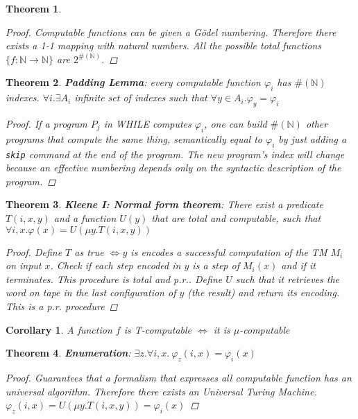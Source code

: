 \documentclass[10pt,landscape]{article}
\newcommand{\N}{\mathbb{N}}
\renewcommand{\iff}{\Leftrightarrow}
\theoremstyle{plain}%
\newtheorem*{thm}{Theorem}
\newtheorem*{cor}{Corollary}
\theoremstyle{definition}
\theoremstyle{remark}
\begin{document}
\begin{multicols}{4}
\begin{thm}
    \begin{proof}
        Computable functions can be given a Gödel numbering. Therefore there exists a 1-1 mapping with
        natural numbers. All the possible total functions $\{f: \N \to \N \}$ are $2^{\#(\N)}$.
    \end{proof}
\end{thm}


\begin{thm}
    \textbf{Padding Lemma}: every computable function $\varphi_i$ has $\#(\N)$ indexes.
    $\forall i . \exists A_i $ infinite set of indexes such that $\forall y \in A_i. \varphi_y = \varphi_i$

    \begin{proof}
        If a program $P_j$ in WHILE computes $\varphi_i$, one can build 
        $\#(\N)$ other programs that compute the same thing, semantically equal to
        $\varphi_i$ by just adding a \texttt{skip} command at the end of the program.
        The new program's index will change because an effective numbering depends only 
        on the syntactic description of the program.  
    \end{proof}
\end{thm}

\columnbreak

\begin{thm}
    \textbf{Kleene I: Normal form theorem}: There exist a predicate $T(i,x,y)$
    and a function $U(y)$ that are total and computable, such that 
    $\forall i,x . \varphi(x) = U(\mu y.T(i,x,y))$

    \begin{proof}
        Define $T$ as true $\iff y$ is encodes a successful computation of the TM $M_i$ on
        input $x$. Check if each step encoded in $y$ is a step of $M_i(x)$ and if it 
        terminates. This procedure is total and p.r.. Define $U$ such that it retrieves
        the word on tape in the last configuration of $y$ (the result) and return its encoding.
        This is a p.r. procedure
    \end{proof}
\end{thm}


\begin{cor}
    A function $f$ is T-computable $\iff$ it is $\mu$-computable
\end{cor}


\begin{thm}
    \textbf{Enumeration}: $\exists z . \forall i,x .\ \varphi_z(i,x) = \varphi_i(x)$ 
    \begin{proof}
        Guarantees that a formalism that expresses all computable function has
        an universal algorithm. Therefore there exists an \textit{Universal Turing Machine}.
        $\varphi_z(i,x) = U(\mu y. T(i, x, y)) = \varphi_i(x)$
    \end{proof}
\end{thm}


\end{multicols}
\end{document}

